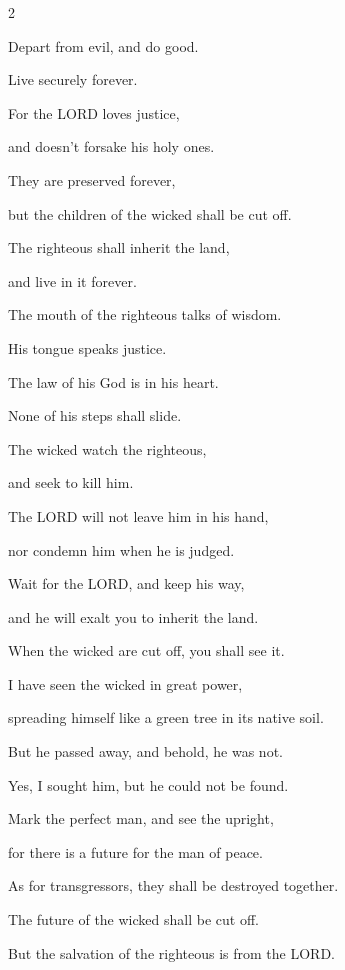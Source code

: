 \begin{multicols}{2}
	
	\myverse{}Depart from evil, and do good.
	
	Live securely forever.
	
	
	\myverse{}For the LORD loves justice,
	
	and doesn’t forsake his holy ones.
	
	They are preserved forever,
	
	but the children of the wicked shall be cut off.
	
	
	\myverse{}The righteous shall inherit the land,
	
	and live in it forever.
	
	\vspace{\baselineskip}
	
	\myverse{}The mouth of the righteous talks of wisdom.
	
	His tongue speaks justice.
	
	
	\myverse{}The law of his God is in his heart.
	
	None of his steps shall slide.
	
	
	\myverse{}The wicked watch the righteous,
	
	and seek to kill him.
	
	
	\myverse{}The LORD will not leave him in his hand,
	
	nor condemn him when he is judged.
	
	
	\myverse{}Wait for the LORD, and keep his way,
	
	and he will exalt you to inherit the land.
	
	When the wicked are cut off, you shall see it.
	
	\vspace{\baselineskip}
	
	\myverse{}I have seen the wicked in great power,
	
	spreading himself like a green tree in its native soil.
	
	
	\myverse{}But he passed away, and behold, he was not.
	
	Yes, I sought him, but he could not be found.
	
	
	\myverse{}Mark the perfect man, and see the upright,
	
	for there is a future for the man of peace.
	
	
	\myverse{}As for transgressors, they shall be destroyed together.
	
	The future of the wicked shall be cut off.
	
	
	\myverse{}But the salvation of the righteous is from the LORD.
	

\end{multicols}

